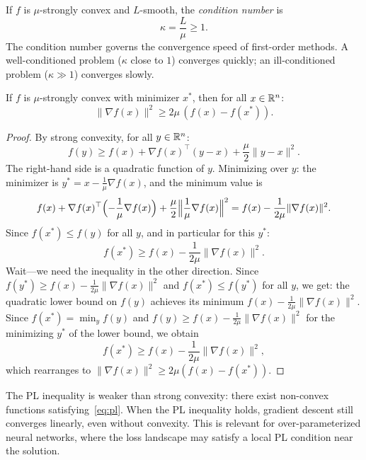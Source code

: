 \documentclass[11pt,a4paper]{article}
\begin{document}
\begin{definition}\label{def:condition-number}
If $f$ is $\mu$-strongly convex and $L$-smooth, the \emph{condition number}
is
\begin{equation}\label{eq:kappa}
  \kappa = \frac{L}{\mu} \ge 1.
\end{equation}
The condition number governs the convergence speed of first-order methods.
A well-conditioned problem ($\kappa$ close to $1$) converges quickly; an
ill-conditioned problem ($\kappa \gg 1$) converges slowly.
\end{definition}

\begin{lemma}\label{lem:pl}
If $f$ is $\mu$-strongly convex with minimizer $x^*$, then for all
$x \in \mathbb{R}^n$:
\begin{equation}\label{eq:pl}
  \|\nabla f(x)\|^2 \ge 2\mu\, (f(x) - f(x^*)).
\end{equation}
\end{lemma}

\begin{proof}
By strong convexity, for all $y \in \mathbb{R}^n$:
\[
  f(y) \ge f(x) + \nabla f(x)^\top(y - x) + \frac{\mu}{2}\|y - x\|^2.
\]
The right-hand side is a quadratic function of $y$. Minimizing over $y$:
the minimizer is $y^* = x - \frac{1}{\mu}\nabla f(x)$, and the minimum
value is
\[
  f(x) + \nabla f(x)^\top\Bigl(-\frac{1}{\mu}\nabla f(x)\Bigr)
  + \frac{\mu}{2}\Bigl\|\frac{1}{\mu}\nabla f(x)\Bigr\|^2
  = f(x) - \frac{1}{2\mu}\|\nabla f(x)\|^2.
\]
Since $f(x^*) \le f(y)$ for all $y$, and in particular for this $y^*$:
\[
  f(x^*) \ge f(x) - \frac{1}{2\mu}\|\nabla f(x)\|^2.
\]
Wait---we need the inequality in the other direction. Since $f(y^*) \ge f(x)
- \frac{1}{2\mu}\|\nabla f(x)\|^2$ and $f(x^*) \le f(y^*)$ for all $y$,
we get: the quadratic lower bound on $f(y)$ achieves its minimum
$f(x) - \frac{1}{2\mu}\|\nabla f(x)\|^2$. Since $f(x^*) = \min_y f(y)$
and $f(y) \ge f(x) - \frac{1}{2\mu}\|\nabla f(x)\|^2$ for the minimizing
$y^*$ of the lower bound, we obtain
\[
  f(x^*) \ge f(x) - \frac{1}{2\mu}\|\nabla f(x)\|^2,
\]
which rearranges to $\|\nabla f(x)\|^2 \ge 2\mu(f(x) - f(x^*))$.
\end{proof}

\begin{remark}\label{rem:pl-general}
The PL inequality is weaker than strong convexity: there exist non-convex
functions satisfying~\eqref{eq:pl}. When the PL inequality holds, gradient
descent still converges linearly, even without convexity. This is relevant
for over-parameterized neural networks, where the loss landscape may
satisfy a local PL condition near the solution.
\end{remark}
\end{document}
